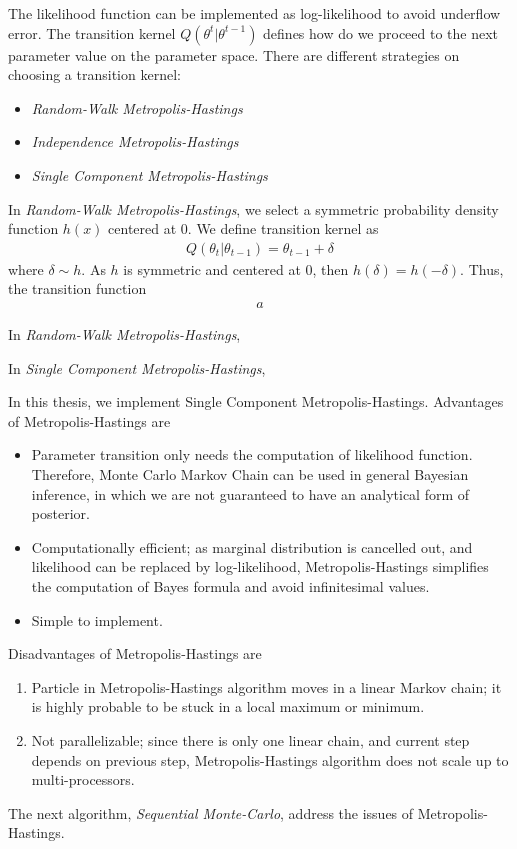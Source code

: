 The likelihood function can be implemented as log-likelihood to avoid underflow error. The
transition kernel $Q(\theta^t|\theta^{t-1})$ defines how do we proceed to the next parameter value
on the parameter space. There are different strategies on choosing a transition kernel:
\begin{itemize}
    \item \textit{Random-Walk Metropolis-Hastings}
    \item \textit{Independence Metropolis-Hastings}
    \item \textit{Single Component Metropolis-Hastings}
\end{itemize}
In \textit{Random-Walk Metropolis-Hastings}, we select a symmetric probability density function
$h(x)$ centered at $0$. We define transition kernel as
\begin{align*}
    Q(\theta_t | \theta_{t-1}) = \theta_{t-1} + \delta
\end{align*}
where $\delta\sim h$. As $h$ is symmetric and centered at $0$, then $h(\delta) = h(-\delta)$. Thus, the transition function
\begin{align*}
    a
\end{align*}

In \textit{Random-Walk Metropolis-Hastings},


In \textit{Single Component Metropolis-Hastings},

In this thesis, we implement Single Component Metropolis-Hastings.
Advantages of Metropolis-Hastings are
\begin{itemize}
    \item Parameter transition only needs the computation of likelihood function.
          Therefore, Monte Carlo Markov Chain can be used in general Bayesian inference,
          in which we are not guaranteed to have an analytical form of posterior.
    \item Computationally efficient; as marginal distribution is cancelled out, and likelihood can
          be replaced by log-likelihood, Metropolis-Hastings simplifies the computation of Bayes formula
          and avoid infinitesimal values.
    \item Simple to implement.
\end{itemize}
Disadvantages of Metropolis-Hastings are
\begin{enumerate}
    \item Particle in Metropolis-Hastings algorithm moves in a linear Markov chain; it is highly
          probable to be stuck in a local maximum or minimum.
    \item Not parallelizable; since there is only one linear chain, and current step depends on
          previous step, Metropolis-Hastings algorithm does not scale up to multi-processors.
\end{enumerate}
The next algorithm, \textit{Sequential Monte-Carlo}, address the issues of Metropolis-Hastings.

